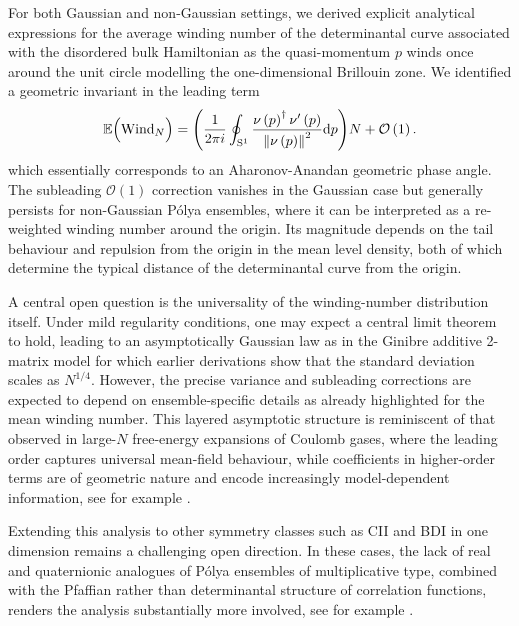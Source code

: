 \documentclass[pdflatex,sn-mathphys-num]{sn-jnl}
\theoremstyle{thmstyleone}
\numberwithin{equation}{section}
\begin{document}
For both Gaussian and non-Gaussian settings, we derived explicit analytical expressions for the average winding number of the determinantal curve associated with the disordered bulk Hamiltonian as the quasi-momentum $p$ winds once around the unit circle modelling the one-dimensional Brillouin zone. We identified a geometric invariant in the leading term
\begin{align*}
    \mathbb{E}\Big(\mathrm{Wind}_{N}\Big)=\Bigg(\frac{1}{2\pi i}\oint_{{\rm S}^{1}}^{}\frac{\nu\left( p \right)^{\dagger}\nu'\left( p\right)}{\left\| \nu\left( p \right) \right\|^{2}}\mathrm{d}p\Bigg)N+\mathcal{O}\left(1\right).
\end{align*}
which essentially corresponds to an Aharonov-Anandan geometric phase angle. The subleading $\mathcal{O}\left(1\right)$ correction vanishes in the Gaussian case but generally persists for non-Gaussian P\'olya ensembles, where it can be interpreted as a re-weighted winding number around the origin. Its magnitude depends on the tail behaviour and repulsion from the origin in the mean level density, both of which determine the typical distance of the determinantal curve from the origin.

A central open question is the universality of the winding-number distribution itself. Under mild regularity conditions, one may expect a central limit theorem to hold, leading to an asymptotically Gaussian law as in the Ginibre additive 2-matrix model for which earlier derivations \cite{hahnUniversalCorrelations2024} show that the standard deviation scales as $N^{1/4}$. However, the precise variance and subleading corrections are expected to depend on ensemble-specific details as already highlighted for the mean winding number. This layered asymptotic structure is reminiscent of that observed in large-$N$ free-energy expansions of Coulomb gases, where the leading order captures universal mean-field behaviour, while coefficients in higher-order terms are of geometric nature and encode increasingly model-dependent information, see for example \cite[Th.~2]{SerfatyGaussianFluctuationsCoulomb2023}.


Extending this analysis to other symmetry classes such as CII and BDI in one dimension remains a challenging open direction. In these cases, the lack of real and quaternionic analogues of P\'olya ensembles of multiplicative type, combined with the Pfaffian rather than determinantal structure of correlation functions, renders the analysis substantially more involved, see for example \cite{hahnWindingNumberStatistics2023a}.
\end{document}
